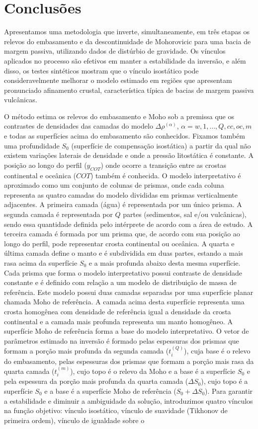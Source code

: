 \chapter{Conclusões}

Apresentamos uma metodologia que inverte, simultaneamente, em três etapas os relevos do embasamento e da descontinuidade de Mohorovicic para uma bacia de margem passiva, utilizando dados de distúrbio de gravidade. Os vínculos aplicados no processo são efetivos em manter a estabilidade da inversão, e além disso, os testes sintéticos mostram que o vínculo isostático pode consideravelmente melhorar o modelo estimado em regiões que apresentam pronunciado afinamento crustal, característica típica de bacias de margem passiva vulcânicas. 

O método estima os relevos do embasamento e Moho sob a premissa que os contrastes de densidades das camadas do modelo $\Delta \rho^{(\alpha)}$, $\alpha = w, 1, \dots, Q, cc, oc, m$ e todas as superfícies acima do embasamento são conhecidos. Fixamos também uma profundidade $S_{0}$ (superfície de compensação isostática) a partir da qual não existem variações laterais de densidade e onde a pressão litostática é constante. A posição ao longo do perfil ($y_{COT}$) onde ocorre a transição entre as crostas continental e oceânica ($COT$) também é conhecida. O modelo interpretativo é aproximado como um conjunto de colunas de prismas, onde cada coluna representa as quatro camadas do modelo divididas em prismas verticalmente adjacentes. A primeira camada (água) é representada por um único prisma. A segunda camada é representada por $Q$ partes (sedimentos, sal e/ou vulcânicas), sendo essa quantidade definida pelo intérprete de acordo com a área de estudo. A terceira camada é formada por um prisma que, de acordo com sua posição ao longo do perfil, pode representar crosta continental ou oceânica. A quarta e última camada define o manto e é subdividida em duas partes, estando a mais rasa acima da superfície $S_{0}$ e a mais profunda abaixo desta mesma superfície. Cada prisma que forma o modelo interpretativo possui contraste de densidade constante e é definido com relação a um modelo de distribuição de massa de referência. Este modelo possui duas camadas separadas por uma superfície planar chamada Moho de referência. A camada acima desta superfície representa uma crosta homogênea com densidade de referência igual a densidade da crosta continental e a camada mais profunda representa um manto homogêneo. A superfície Moho de referência forma a base do modelo interpretativo. O vetor de parâmetros estimado na inversão é formado pelas espessuras dos prismas que formam a porção mais profunda da segunda camada ($t^{(Q)}_{i}$), cuja base é o relevo do embasamento, pelas espessuras dos prismas que formam a porção mais rasa da quarta camada ($t^{(m)}_{i}$), cujo topo é o relevo da Moho e a base é a superfície $S_{0}$ e pela espessura da porção mais profunda da quarta camada ($\Delta S_{0}$), cujo topo é a superfície $S_{0}$ e a base é a superfície Moho de referência ($S_{0} + \Delta S_{0}$). Para garantir a estabilidade e diminuir a ambiguidade da solução, introduzimos quatro vínculos na função objetivo: vínculo isostático, vínculo de suavidade (Tikhonov de primeira ordem), vínculo de igualdade sobre o 